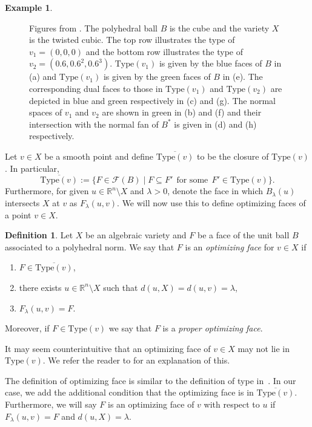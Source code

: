 \documentclass{article}
\numberwithin{theorem}{section}
\theoremstyle{definition}
\newtheorem{definition}[theorem]{Definition}
\newtheorem{example}[theorem]{Example}
\theoremstyle{example_contd}
\newcommand{\F}{\mathcal{F}}
\newcommand{\RR}{\mathbb{R}}
\newcommand{\type}{\mathrm{Type}}
\renewcommand{\l}{\lambda}
\begin{document}
\begin{example}
\begin{figure}
	\caption{Figures from . The polyhedral ball $B$ is the cube and the variety $X$ is the twisted cubic. The top row illustrates the type of $v_1=(0,0,0)$ and the bottom row illustrates the type of
	 $v_2=(0.6,0.6^2,0.6^3)$.  
     $\type(v_1)$ is given by the blue faces of $B$ in (a) and $\type(v_1)$ is given by the green faces of $B$ in (e).         The corresponding dual faces to those in $\type(v_1)$ and $\type(v_2)$ are depicted in blue and green respectively in (c) and (g).
    The normal spaces of $v_1$ and $v_2$ are shown in green in (b) and (f) and their intersection with the normal fan of $B^*$ is given in (d) and (h) respectively.
        }
	\label{fig:space_curves}
\end{figure}

\end{example}


Let $v \in X$ be a smooth point and define $\overline{\type(v)}$ to be the closure of $\type(v)$. In particular,
$$\overline{\type(v)}:=\{  F\in \F(B) \mid F \subseteq F' ~~\mbox{for some}~~
F'\in \type(v)\}.$$
Furthermore, for given $u\in \RR^n\setminus X$ and $\lambda>0$, denote the face in which $B_\lambda(u)$ intersects $X$ at $v$ as $F_\l(u,v).$ 
We will now use this to define optimizing faces of a point $v\in X$.


\begin{definition}\label{def:optimizing_face}
	Let $X$ be an algebraic variety and $F$ be a face of the unit ball $B$ associated to a polyhedral norm. We say that $F$ is an \textit{optimizing face} for $v\in X$ if 
	\begin{enumerate}[label=(\roman*)]
		\item 
		$F\in \overline{\type(v)}$,
		\item there exists $u\in \RR^n\setminus X$ such that $d(u,X)=d(u,v)=\lambda$, 
		\item $F_\lambda(u,v)=F$. 
	\end{enumerate}
	Moreover, if $F\in \type(v)$ we say that $F$ is a \emph{proper optimizing face}.
\end{definition}



It may seem counterintuitive that an optimizing face of $v \in X$ may not lie in $\type(v)$. We refer the reader to  for an explanation of this.

The definition of optimizing face is similar to the definition of type in~\cite[Proposition 4]{CELIK_Wasserstein}. In our case, we add the additional condition that the optimizing face is in $\overline{\type(v)}.$ Furthermore, we will say $F$ is an optimizing face of $v$ with respect to $u$ if  $F_\lambda(u,v)=F$ and $d(u,X)=\lambda.$
\end{document}
